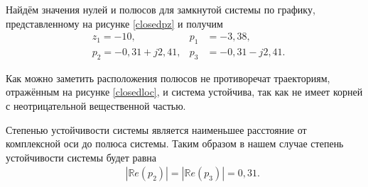 \documentclass[fleqn, a4paper, 11pt, russian]{article}
\newcommand{\R}{\mathbb{R}}
\begin{document}
	Найдём значения нулей и полюсов для замкнутой системы по графику, представленному на рисунке \ref{closedpz} и получим
	\begin{align}
		&z_1 = -10, &p_1 &= -3,38,\\
		&p_2 = -0,31 + j2,41, &p_3 & = -0,31 - j2,41.
	\end{align}
	
	Как можно заметить расположения полюсов не противоречат траекториям, отражённым на рисунке \ref{closedloc}, и система устойчива, так как не имеет корней с неотрицательной вещественной частью.
	
	Степенью устойчивости системы является наименьшее расстояние от комплексной оси до полюса системы. Таким образом в нашем случае степень устойчивости системы будет равна
	\begin{align}
		&&|\R e(p_2)| = |\R e(p_3)| = 0,31.
	\end{align}
	
\end{document}
